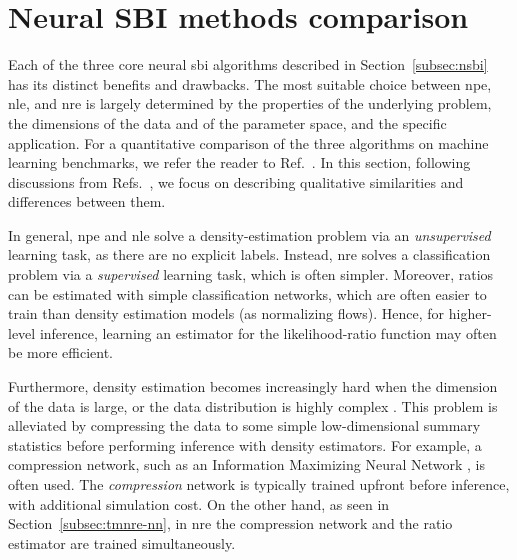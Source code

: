 \section{Neural SBI methods comparison} \label{sec:comparison}

Each of the three core neural \gls*{sbi} algorithms described in Section~\ref{subsec:nsbi} has its distinct benefits and drawbacks. The most suitable choice between \gls*{npe}, \gls*{nle}, and \gls*{nre} is largely determined by the properties of the underlying problem, the dimensions of the data and of the parameter space, and the specific application. For a quantitative comparison of the three algorithms on machine learning benchmarks, we refer the reader to Ref.~\cite{Lueckmann:2021aa}. In this section, following discussions from Refs.~\cite{Cranmer:2019eaq, Cole:2021gwr, Ho:2024whi}, we focus on describing qualitative similarities and differences between them.


In general, \gls*{npe} and \gls*{nle} solve a density-estimation problem via an \emph{unsupervised} learning task, as there are no explicit labels. Instead, \gls*{nre} solves a classification problem via a \emph{supervised} learning task, which is often simpler. Moreover, ratios can be estimated with simple classification networks, which are often easier to train than density estimation models (as normalizing flows). Hence, for higher-level inference, learning an estimator for the likelihood-ratio function may often be more efficient.

Furthermore, density estimation becomes increasingly hard when the dimension of the data is large, or the data distribution is highly complex \cite{papamakarios2021normalizing}. This problem is alleviated by compressing the data to some simple low-dimensional summary statistics before performing inference with density estimators. For example, a compression network, such as an Information Maximizing Neural Network \cite{charnock2018automatic}, is often used. The \emph{compression} network is typically trained upfront before inference, with additional simulation cost. On the other hand, as seen in Section~\ref{subsec:tmnre-nn}, in \gls*{nre} the compression network and the ratio estimator are trained simultaneously.    	 

